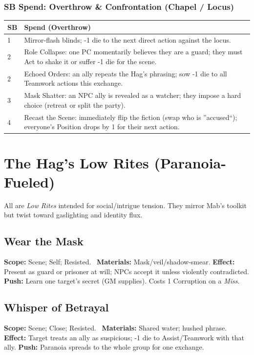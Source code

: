 \documentclass[11pt]{article}
\begin{document}
\subsubsection{SB Spend: Overthrow \& Confrontation (Chapel / Locus)}
\begin{longtable}{@{}p{1.5cm}p{13.2cm}@{}}
\toprule
\textbf{SB} & \textbf{Spend (Overthrow)} \\
\midrule
1 & Mirror-flash blinds; -1 die to the next direct action against the locus. \\
2 & Role Collapse: one PC momentarily believes they are a guard; they must Act to shake it or suffer -1 die for the scene. \\
2 & Echoed Orders: an ally repeats the Hag's phrasing; sow -1 die to all Teamwork actions this exchange. \\
3 & Mask Shatter: an NPC ally is revealed as a watcher; they impose a hard choice (retreat or split the party). \\
4 & Recast the Scene: immediately flip the fiction (swap who is ''accused``); everyone's Position drops by 1 for their next action. \\
\bottomrule
\end{longtable}

\section{The Hag's Low Rites (Paranoia-Fueled)}
All are \emph{Low Rites} intended for social/intrigue tension. They mirror Mab's toolkit but twist toward gaslighting and identity flux.

\subsection{Wear the Mask}
\textbf{Scope:} Scene; Self; Resisted. \ \textbf{Materials:} Mask/veil/shadow-smear.  
\textbf{Effect:} Present as guard or prisoner at will; NPCs accept it unless violently contradicted.  
\textbf{Push:} Learn one target's secret (GM supplies). Costs 1 Corruption on a \emph{Miss}.

\subsection{Whisper of Betrayal}
\textbf{Scope:} Scene; Close; Resisted. \ \textbf{Materials:} Shared water; hushed phrase.  
\textbf{Effect:} Target treats an ally as suspicious; -1 die to Assist/Teamwork with that ally.  
\textbf{Push:} Paranoia spreads to the whole group for one exchange.
\end{document}
